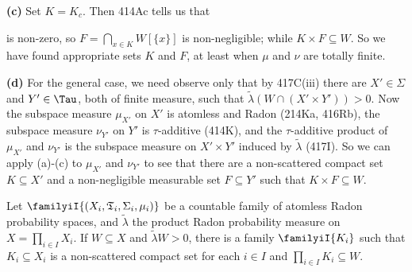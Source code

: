 {\medskip

{\bf (c)} Set $K=K_c$.   Then 414Ac tells us that


\noindent is non-zero, so $F=\bigcap_{x\in K}W[\{x\}]$ is
non-negligible;  while $K\times F\subseteq W$.   So we have found
appropriate sets $K$ and $F$, at least when $\mu$ and $\nu$ are totally
finite.

\medskip

{\bf (d)} For the general case, we need observe only that by 417C(iii)
there are $X'\in\Sigma$ and $Y'\in\Tau$, both of finite measure, such
that $\tilde\lambda(W\cap(X'\times Y'))>0$.   Now the subspace measure
$\mu_{X'}$ on $X'$ is atomless and Radon (214Ka, 416Rb), the subspace
measure $\nu_{Y'}$ on $Y'$ is $\tau$-additive (414K), and the
$\tau$-additive product of $\mu_{X'}$ and $\nu_{Y'}$ is the subspace
measure on $X'\times Y'$ induced by $\tilde\lambda$ (417I).   So we can
apply (a)-(c) to $\mu_{X'}$ and $\nu_{Y'}$ to see that there are a
non-scattered compact set $K\subseteq X'$ and a non-negligible
measurable set $F\subseteq Y'$ such that $K\times F\subseteq W$.
}%

 Let
$\familyiI{(X_i,\frak T_i,\Sigma_i,\mu_i)}$ be a countable family of
atomless Radon probability spaces, and $\tilde\lambda$ the product Radon
probability measure on $X=\prod_{i\in I}X_i$.
If $W\subseteq X$ and $\tilde\lambda W>0$, there is a family
$\familyiI{K_i}$ such that $K_i\subseteq X_i$ is a non-scattered compact
set for each $i\in I$ and $\prod_{i\in I}K_i\subseteq W$.


